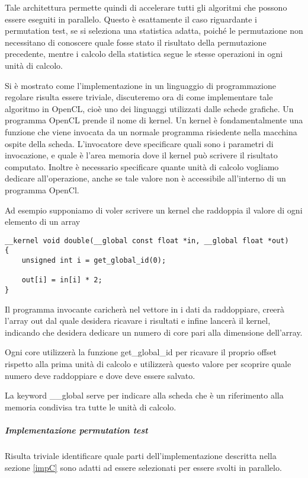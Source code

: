 Tale architettura permette quindi di accelerare tutti gli algoritmi che possono essere eseguiti in parallelo. Questo è esattamente il caso riguardante i permutation test, se si seleziona una statistica adatta, poiché le permutazione non necessitano di conoscere quale fosse stato il risultato della permutazione precedente, mentre i calcolo della statistica segue le stesse operazioni in ogni unità di calcolo.

Si è mostrato come l'implementazione in un linguaggio di programmazione regolare risulta essere triviale, discuteremo ora di come implementare tale algoritmo in OpenCL, cioè uno dei linguaggi utilizzati dalle schede grafiche. Un programma OpenCL prende il nome di kernel. Un kernel è fondamentalmente una funzione che viene invocata da un normale programma risiedente nella macchina ospite della scheda. L'invocatore deve specificare quali sono i parametri di invocazione, e quale è l'area memoria dove il kernel può scrivere il risultato computato. 
Inoltre è necessario specificare quante unità di calcolo vogliamo dedicare all'operazione, anche se tale valore non è accessibile all'interno di un programma OpenCl.

Ad esempio supponiamo di voler scrivere un kernel che raddoppia il valore di ogni elemento di un array


\begin{lstlisting}[style=CStyle]
__kernel void double(__global const float *in, __global float *out)
{
	unsigned int i = get_global_id(0);
	
	out[i] = in[i] * 2;
}
\end{lstlisting}

Il programma invocante caricherà nel vettore in i dati da raddoppiare, creerà l'array out dal quale desidera ricavare i risultati e infine lancerà il kernel, indicando che desidera dedicare un numero di core pari alla dimensione dell'array.

Ogni core utilizzerà la funzione get\_global\_id per ricavare il proprio offset rispetto alla prima unità di calcolo e utilizzerà questo valore per scoprire quale numero deve raddoppiare e dove deve essere salvato.

La keyword \_\_global serve per indicare alla scheda che è un riferimento alla memoria condivisa tra tutte le unità di calcolo. 

\subparagraph{Implementazione permutation test}
Risulta triviale identificare quale parti dell'implementazione descritta nella sezione \ref{impC} sono adatti ad essere selezionati per essere svolti in parallelo.

